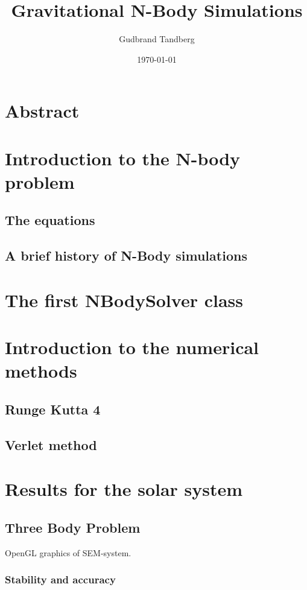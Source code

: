 \documentclass[11pt, oneside]{article}   	%
\title{Gravitational N-Body Simulations}
\author{Gudbrand Tandberg}
\date{\today}							%
\begin{document}
\maketitle
\newpage


\section{Abstract}

\section{Introduction to the N-body problem}
\subsection{The equations}
\subsection{A brief history of N-Body simulations}

\section{The first NBodySolver class}

\section{Introduction to the numerical methods}
\subsection{Runge Kutta 4}
\subsection{Verlet method}

\section{Results for the solar system}
\subsection{Three Body Problem}
OpenGL graphics of SEM-system. 
\subsubsection{Stability and accuracy}
\end{document}
